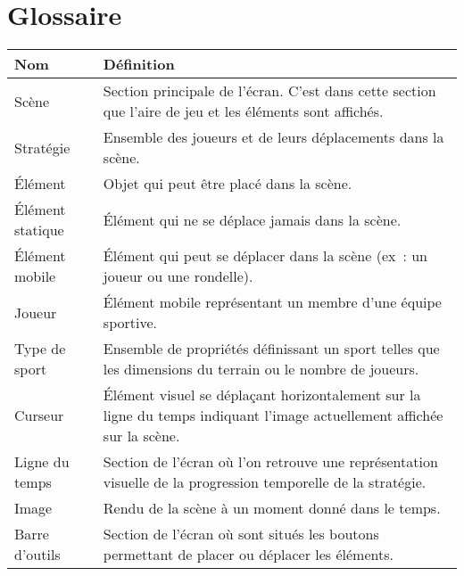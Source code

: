 \chapter{Glossaire}
\label{s:glossaire}
{\def\arraystretch{1.5}\tabcolsep=5pt
\begin{tabularx}{\textwidth}{|l|X|}
	\hline
	Nom & Définition \\
	\hline
	Scène 				& Section principale de l'écran. C'est dans cette section que l'aire de jeu et les éléments sont affichés. \\
	Stratégie  			& Ensemble des joueurs et de leurs déplacements dans la scène. \\
	Élément 			& Objet qui peut être placé dans la scène. \\
	Élément statique 	& Élément qui ne se déplace jamais dans la scène. \\
	Élément mobile 		& Élément qui peut se déplacer dans la scène (ex~: un joueur ou une rondelle). \\
	Joueur				& Élément mobile représentant un membre d'une équipe sportive. \\
	Type de sport		& Ensemble de propriétés définissant un sport telles que les dimensions du terrain ou le nombre de joueurs. \\
	Curseur 			& Élément visuel se déplaçant horizontalement sur la ligne du temps indiquant l'image actuellement affichée sur la scène. \\
	Ligne du temps 		& Section de l'écran où l'on retrouve une représentation visuelle de la progression temporelle de la stratégie. \\
	Image				& Rendu de la scène à un moment donné dans le temps. \\
	Barre d'outils 		& Section de l'écran où sont situés les boutons permettant de placer ou déplacer les éléments. \\
	\hline
\end{tabularx}
}